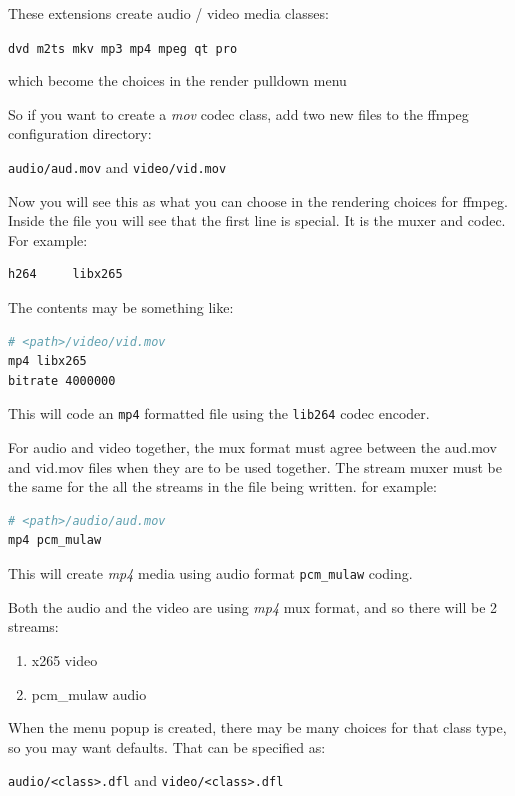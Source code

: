 These extensions create audio / video media classes:

\texttt{dvd \quad  m2ts \quad  mkv \quad  mp3 \quad  mp4 \quad  mpeg  \quad qt \quad  pro}

which become the choices in the render pulldown menu

So if you want to create a \textit{mov} codec class, add two new files to the ffmpeg configuration directory:

\texttt{audio/aud.mov}  and  \texttt{video/vid.mov}

Now you will see this as what you can choose in the rendering choices for ffmpeg.
Inside the file you will see that the first line is special.  It is the muxer and codec.  For example:

\begin{lstlisting}[language=bash]
h264     libx265
\end{lstlisting}

The contents may be something like:

\begin{lstlisting}[language=bash]
# <path>/video/vid.mov 
mp4 libx265
bitrate 4000000
\end{lstlisting}

This will code an \texttt{mp4} formatted file using the \texttt{lib264} codec encoder.

For audio and video together, the mux format must agree between the aud.mov and vid.mov files when they are to be used together.  The stream muxer must be the same for the all the streams in the file being written.
for example:

\begin{lstlisting}[language=bash]
# <path>/audio/aud.mov
mp4 pcm_mulaw
\end{lstlisting}

This will create \textit{mp4} media using audio format \texttt{pcm\_mulaw} coding.

Both the audio and the video are using \textit{mp4} mux format, and so there will be 2 streams:
\begin{enumerate}
    \item x265 video
    \item pcm\_mulaw audio
\end{enumerate}

When the menu popup is created, there may be many choices for that class type, so you may want defaults.  That can be specified as:

\texttt{audio/<class>.dfl}  and  \texttt{video/<class>.dfl}

